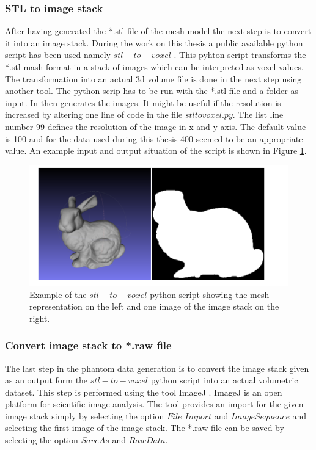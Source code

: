 \subsubsection{STL to image stack}

After having generated the *.stl file of the mesh model the next step is to convert it into an image stack. During the work on this thesis a public available python script has been used namely $stl-to-voxel$ \cite{Pederkoff2015Stl-to-voxel}. This pyhton script transforms the *.stl mash format in a stack of images which can be interpreted as voxel values. The transformation into an actual \gls{3d} volume file is done in the next step using another tool. The python scrip has to be run with the *.stl file and a folder as input. In then generates the images. It might be useful if the resolution is increased by altering one line of code in the file $stltovoxel.py$. The list line number 99 defines the resolution of the image in x and y axis. The default value is 100 and for the data used during this thesis 400 seemed to be an appropriate value. An example input and output situation of the script is shown in Figure \ref{fig:stlToVoxel}.

\begin{figure} [!htb]
    \centering
	\includegraphics[width=14cm]{content/images/stlToVoxel}
	\caption{Example of the $stl-to-voxel$ python script showing the mesh representation on the left and one image of the image stack on the right.} 
	\label{fig:stlToVoxel}
\end{figure}

\newpage
\subsubsection{Convert image stack to *.raw file}

The last step in the phantom data generation is to convert the image stack given as an output form the $stl-to-voxel$ python script into an actual volumetric dataset. This step is performed using the tool ImageJ  \cite{Ecosystem2018ImageJ}. ImageJ is an open platform for scientific image analysis. The tool provides an import for the given image stack simply by selecting the option $File$ $Import$ and $Image Sequence$ and selecting the first image of the image stack. The *.raw file can be saved by selecting the option $Save As$ and $Raw Data$.

